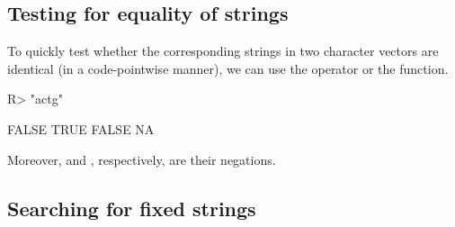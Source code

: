 \documentclass[nojss]{jss}
\begin{document}
\subsection{Testing for equality of strings}



To quickly test whether the corresponding strings in two character vectors
are identical (in a code-pointwise manner), we can use the 
operator or the  function.

\begin{Schunk}
\begin{Sinput}
R> "actg" %s===% c("ACTG", "actg", "act", NA)  # recycling rule
\end{Sinput}
\begin{Soutput}
[1] FALSE  TRUE FALSE    NA
\end{Soutput}
\end{Schunk}

Moreover,  and , respectively,
are their negations.


\subsection{Searching for fixed strings}
\end{document}
